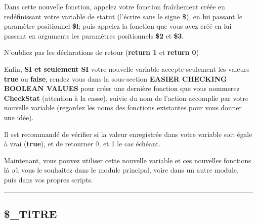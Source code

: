\documentclass[a4paper,10pt]{article}
\begin{document}
\begin{justify}
    Dans cette nouvelle fonction, appelez votre fonction fraîchement créée en redéfinissant votre variable de statut (l'écrire sans le signe \textbf{\$}), en lui passant le paramètre positionnel \textbf{\$l}; puis appelez la fonction que vous avez créé en lui passant en arguments les paramètres positionnels \textbf{\$2} et \textbf{\$3}.
\end{justify}

\begin{justify}
    N'oubliez pas les déclarations de retour (\textbf{\color{cmds}return 1} et \textbf{\color{cmds}return 0})\\\mbox{}
\end{justify}


\begin{justify}
    Enfin, \textbf{SI et seulement SI} votre nouvelle variable accepte seulement les valeurs \textbf{true} ou \textbf{false}, rendez vous dans la sous-section \textbf{EASIER CHECKING BOOLEAN VALUES} pour créer une dernière fonction que vous nommerez \textbf{\color{mauve}CheckStat} (attention à la casse), suivie du nom de l'action accomplie par votre nouvelle variable (regardez les noms des fonctions existantes pour vous donner une idée).
\end{justify}

\begin{justify}
Il est recommandé de vérifier si la valeur enregistrée dans votre variable soit égale à vrai (\textbf{true}), et de retourner 0, et 1 le cas échéant.
\end{justify}

\begin{justify}
    Maintenant, vous pouvez utiliser cette nouvelle variable et ces nouvelles fonctions là où vous le souhaitez dans le module principal, voire dans un autre module, puis dans vos propres scripts.
\end{justify}




\color{sec2}\par\noindent\rule{\textwidth}{0.4pt}\color{text}

\color{sec2}
\subsection{\$\_TITRE}\color{text}
\end{document}
